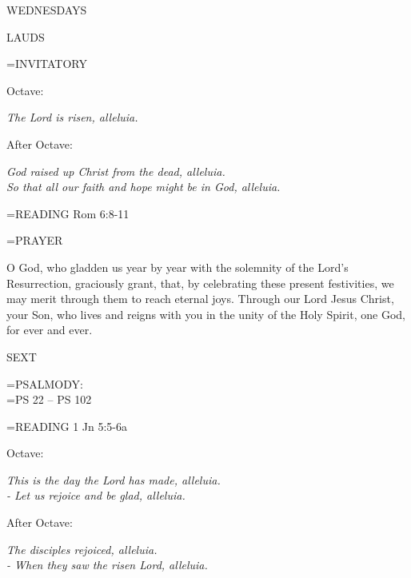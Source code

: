 \begin{center}\normalsize WEDNESDAYS\\
\end{center}

\begin{flushleft}\normalsize LAUDS\\\end{flushleft}

\hangindent=\parindent \small{INVITATORY}
\begin{center}
\end{center}Octave:\begin{center}\textit{	The Lord is risen, alleluia.\\}
\end{center}After Octave:\begin{center}\textit{	God raised up Christ from the dead, alleluia.\\}
\textit{So that all our faith and hope might be in God, alleluia.\\}
\end{center}

\hangindent=\parindent \small{\uppercase{READING}}    Rom 6:8-11 \textbf{   \\}

\hangindent=\parindent \small PRAYER
\begin{description}[labelindent=\parindent, leftmargin=*]
\item [Octave:] 	O God, who gladden us year by year with the solemnity of the Lord's Resurrection, graciously grant, that, by celebrating these present festivities, we may merit through them to reach eternal joys. Through our Lord Jesus Christ, your Son, who lives and reigns with you in the unity of the Holy Spirit, one God, for ever and ever.
\item [After Octave:] 	
\end{description}

\begin{flushleft}\normalsize SEXT\\\end{flushleft}

\hangindent=\parindent \small{PSALMODY:}\\
\hangindent=\parindent  PS 22 -- PS 102\vspace{0.5em}

\hangindent=\parindent \small{\uppercase{READING}}    1 Jn 5:5-6a \textbf{   \\}

\begin{center}
\end{center}Octave:\begin{center}\textit{	This is the day the Lord has made, alleluia.\\
- Let us rejoice and be glad, alleluia.}
\end{center}After Octave:\begin{center}\textit{	The disciples rejoiced, alleluia.\\
- When they saw the risen Lord, alleluia.}
\end{center}

